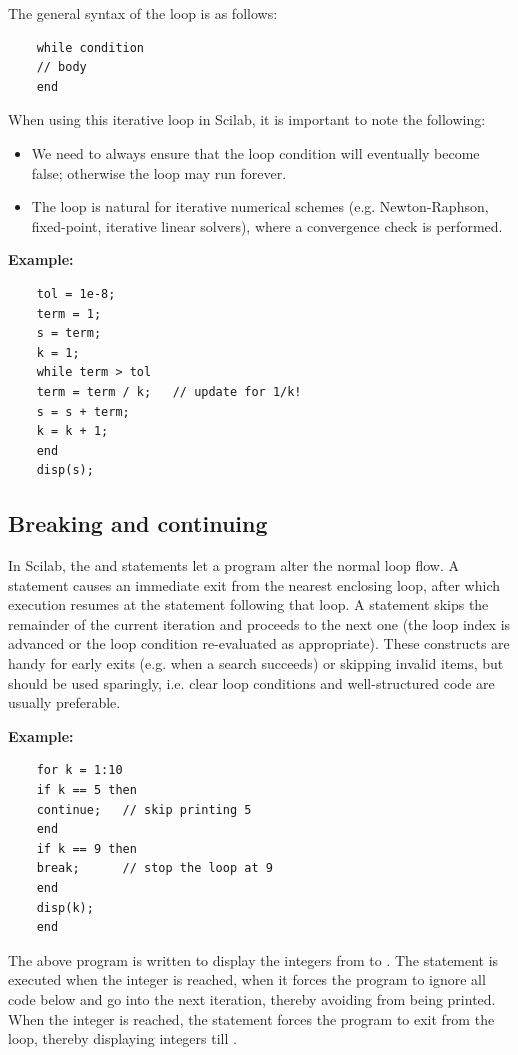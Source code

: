 		The general syntax of the  loop is as follows:
		\begin{verbatim}
	while condition
	// body
	end
		\end{verbatim}
		When using this iterative loop in Scilab, it is important to note the following:
		\begin{itemize}
			\item We need to always ensure that the loop condition will eventually become false; otherwise the loop may run forever.
			\item The  loop is natural for iterative numerical schemes (e.g. Newton-Raphson, fixed-point, iterative linear solvers), where a convergence check is performed.
		\end{itemize}
		
		\textbf{Example:}
		\begin{verbatim}
	tol = 1e-8;
	term = 1;
	s = term;
	k = 1;
	while term > tol
	term = term / k;   // update for 1/k!
	s = s + term;
	k = k + 1;
	end
	disp(s);
		\end{verbatim}
	
	\subsection{Breaking and continuing}
		In Scilab, the  and  statements let a program alter the normal loop flow. A  statement causes an immediate exit from the nearest enclosing loop, after which execution resumes at the statement following that loop. A  statement skips the remainder of the current iteration and proceeds to the next one (the loop index is advanced or the loop condition re-evaluated as appropriate). These constructs are handy for early exits (e.g. when a search succeeds) or skipping invalid items, but should be used sparingly, i.e. clear loop conditions and well-structured code are usually preferable.
		
		\textbf{Example:}
		\begin{verbatim}
	for k = 1:10
	if k == 5 then
	continue;   // skip printing 5
	end
	if k == 9 then
	break;      // stop the loop at 9
	end
	disp(k);
	end
		\end{verbatim}
		The above program is written to display the integers from  to . The  statement is executed when the integer  is reached, when it forces the program to ignore all code below and go into the next iteration, thereby avoiding  from being printed. When the integer  is reached, the  statement forces the program to exit from the loop, thereby displaying integers till .